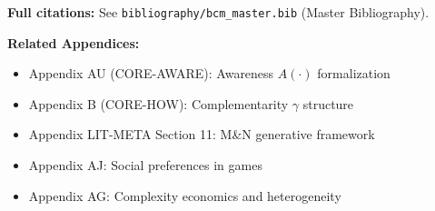 \textbf{Full citations:} See \texttt{bibliography/bcm\_master.bib} (Master Bibliography).

\textbf{Related Appendices:}
\begin{itemize}[nosep]
    \item Appendix AU (CORE-AWARE): Awareness $A(\cdot)$ formalization
    \item Appendix B (CORE-HOW): Complementarity $\gamma$ structure
    \item Appendix LIT-META Section 11: M\&N generative framework
    \item Appendix AJ: Social preferences in games
    \item Appendix AG: Complexity economics and heterogeneity
\end{itemize}


